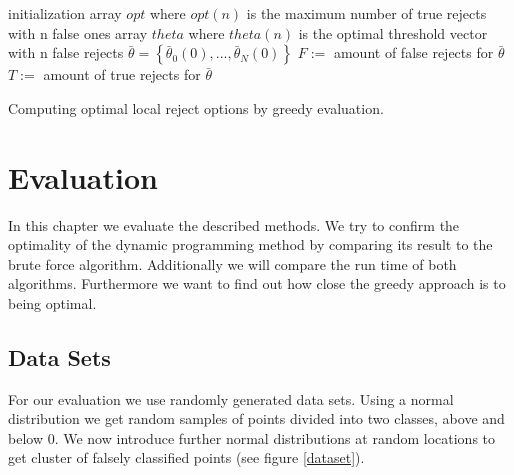 \begin{algorithm}[!htbp]
 initialization\;
 array $opt$ where $opt(n)$ is the maximum number of true rejects with n false ones \;
 array $theta$ where $theta(n)$ is the optimal threshold vector with n false rejects \; 
 $\bar{\theta} = \left\{\bar{\theta}_0(0),...,\bar{\theta}_N(0)\right\}$ \; 
 $F :=$ amount of false rejects for $\bar{\theta}$ \;
 $T :=$ amount of true rejects for $\bar{\theta}$ \;
 \BlankLine \BlankLine
 \caption{Computing optimal local reject options by greedy evaluation.}
 \label{greedy}
\end{algorithm}

\section{Evaluation}
In this chapter we evaluate the described methods. We try to confirm the optimality of the dynamic programming method by comparing its result to the brute force algorithm. Additionally we will compare the run time of both algorithms. Furthermore we want to find out how close the greedy approach is to being optimal.

\subsection{Data Sets}
For our evaluation we use randomly generated data sets. Using a normal distribution we get random samples of points divided into two classes, above and below $0$. We now introduce further normal distributions at random locations to get cluster of falsely classified points (see figure \ref{dataset}).

